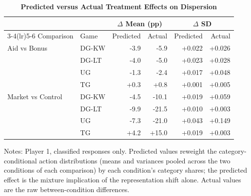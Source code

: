 \begin{table}[!htbp]
\centering
\small
\renewcommand{\arraystretch}{1.15}
\caption{\textbf{Predicted versus Actual Treatment Effects on Dispersion}}
\label{tab:heterogeneity_predicted_actual}
\begin{tabular}{ll rr rr}
\toprule
 & & \multicolumn{2}{c}{$\Delta$ Mean (pp)} & \multicolumn{2}{c}{$\Delta$ SD} \\
\cmidrule(lr){3-4}\cmidrule(lr){5-6}
Comparison & Game & Predicted & Actual & Predicted & Actual \\
\midrule
Aid vs Bonus & DG-KW & -3.9 & -5.9 & +0.022 & +0.026 \\
 & DG-LT & -4.0 & -5.0 & +0.023 & +0.028 \\
 & UG & -1.3 & -2.4 & +0.017 & +0.048 \\
 & TG & +0.3 & +0.8 & +0.001 & +0.005 \\
\midrule
Market vs Control & DG-KW & -4.5 & -10.1 & +0.019 & +0.059 \\
 & DG-LT & -9.9 & -21.5 & +0.010 & +0.003 \\
 & UG & -7.3 & -21.0 & +0.043 & +0.149 \\
 & TG & +4.2 & +15.0 & +0.019 & +0.003 \\
\bottomrule
\end{tabular}
\begin{flushleft}
\footnotesize Notes: Player 1, classified responses only. Predicted values reweight the category-conditional action distributions (means and variances pooled across the two conditions of each comparison) by each condition's category shares; the predicted effect is the mixture implication of the representation shift alone. Actual values are the raw between-condition differences.
\end{flushleft}
\end{table}

